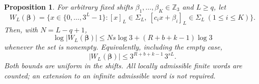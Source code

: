 \documentclass[11pt]{article}
\newtheorem{proposition}[theorem]{Proposition}
\theoremstyle{definition}
\theoremstyle{remark}
\newcommand{\Z}{\mathbb Z}
\newcommand{\Sig}{\Sigma}
\begin{document}
\begin{proposition}\label{real:prop:finite}
For arbitrary fixed shifts $\beta_1,\ldots,\beta_K\in\Z_3$ and
$L\ge q$, let
\[
 W_L(\boldsymbol\beta)=
 \{x\in\{0,\ldots,3^L-1\}:
      [x]_L\in\Sig_L,\ [c_ix+\beta_i]_L\in\Sig_L\ (1\le i\le K)\}.
\]
Then, with $N=L-q+1$,
\begin{equation}\label{real:eq:finite}
 \log|W_L(\boldsymbol\beta)|
 \le Ns\log3+(R+b+k-1)\log3
\end{equation}
whenever the set is nonempty. Equivalently, including the empty case,
\begin{equation}\label{real:eq:finite-simple}
 |W_L(\boldsymbol\beta)|\le 3^{R+b+k-1}\,3^{sL}.
\end{equation}
Both bounds are uniform in the shifts. All locally admissible finite
words are counted; an extension to an infinite admissible word is not
required.
\end{proposition}
\end{document}
